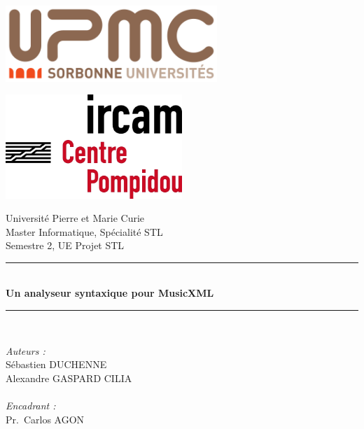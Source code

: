 \documentclass[a4paper,12pt]{article}
\begin{document}

\begin{titlepage}
\begin{center}

\begin{minipage}[c]{.46\linewidth}
  \centering
  \includegraphics[width=0.6\textwidth]{logo_UPMC.png}\\[1cm]
\end{minipage}
\hfill
\begin{minipage}[c]{.46\linewidth}
  \centering
  \includegraphics[width=0.5\textwidth]{logo_ircam.png}\\[1cm]
\end{minipage}

\vspace*{1cm}

{\large Université Pierre et Marie Curie}\\[1cm]

{\large Master Informatique, Spécialité STL}\\[1cm]

{\large Semestre 2, UE Projet STL}\\[1cm]

\rule{\linewidth}{0.5mm} \\[0.5cm]
{ \huge \bfseries Un analyseur syntaxique pour MusicXML \\[0.4cm] }
\rule{\linewidth}{0.5mm} \\[0.5cm]

\vspace*{1cm}

\noindent
\begin{minipage}{0.5\textwidth}
  \begin{flushleft} \large
    \emph{Auteurs :}\\
      Sébastien DUCHENNE\\
      Alexandre GASPARD CILIA\\~\\
    \emph{Encadrant :} \\
    Pr.~Carlos AGON\\
  \end{flushleft}
\end{minipage}


\end{center}
\end{titlepage}
\end{document}
